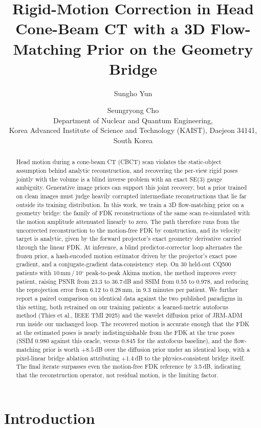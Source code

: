 \documentclass[11pt]{article}
\title{\bfseries Rigid-Motion Correction in Head Cone-Beam CT with a 3D Flow-Matching
Prior on the Geometry Bridge}
\author{%
Sungho Yun \and Seungryong Cho\\[2pt]
{\normalsize Department of Nuclear and Quantum Engineering,}\\
{\normalsize Korea Advanced Institute of Science and Technology (KAIST), Daejeon 34141, South Korea}}
\date{}
\begin{document}
\maketitle

\begin{abstract}
\noindent
Head motion during a cone-beam CT (CBCT) scan violates the static-object assumption behind
analytic reconstruction, and recovering the per-view rigid poses jointly with the volume is a
blind inverse problem with an exact SE(3) gauge ambiguity. Generative image priors can support
this joint recovery, but a prior trained on clean images must judge heavily corrupted
intermediate reconstructions that lie far outside its training distribution. In this work, we
train a 3D flow-matching prior on a geometry bridge: the family of FDK reconstructions of the
same scan re-simulated with the motion amplitude attenuated linearly to zero. The path
therefore runs from the uncorrected reconstruction to the motion-free FDK by construction, and
its velocity target is analytic, given by the forward projector's exact geometry derivative
carried through the linear FDK. At inference, a blind predictor-corrector loop alternates the
frozen prior, a hash-encoded motion estimator driven by the projector's exact pose gradient,
and a conjugate-gradient data-consistency step. On 30 held-out CQ500 patients with
10\,mm\,/\,10$^\circ$ peak-to-peak Akima motion, the method improves every patient, raising
PSNR from 23.3 to 36.7\,dB and SSIM from 0.55 to 0.978, and reducing the reprojection error
from 6.12 to 0.28\,mm, in 9.3 minutes per patient. We further report a paired comparison on
identical data against the two published paradigms in this setting, both retrained on our
training patients: a learned-metric autofocus method (Thies et al., IEEE TMI 2025) and the
wavelet diffusion prior of JRM-ADM run inside our unchanged loop. The recovered motion is
accurate enough that the FDK at the estimated poses is nearly indistinguishable from the FDK
at the true poses (SSIM 0.980 against this oracle, versus 0.845 for the autofocus baseline),
and the flow-matching prior is worth $+8.5$\,dB over the diffusion prior under an identical
loop, with a pixel-linear bridge ablation attributing $+1.4$\,dB to the physics-consistent
bridge itself. The final iterate surpasses even the motion-free FDK reference by 3.5\,dB,
indicating that the reconstruction operator, not residual motion, is the limiting factor.
\end{abstract}

\section{Introduction}
\label{sec:intro}
\end{document}
